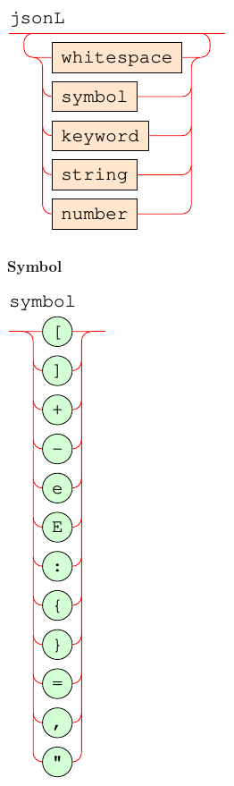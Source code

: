 \documentclass[a4paper]{article}
\begin{document}

{\centering

   \includegraphics[scale=0.9]{syntax/Lexical/jsonL}

}
\newpage

\subsubsection{Symbol}


{\centering

   \includegraphics[scale=0.9]{syntax/Lexical/symbol}

}
\end{document}
